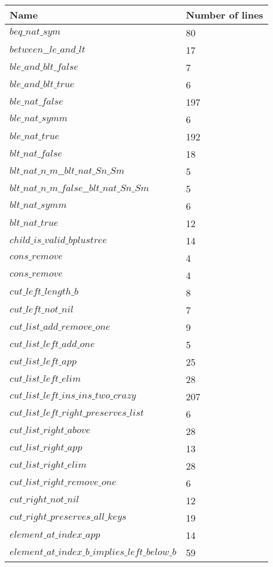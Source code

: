 \begin{tabular}{| l | l |}
\hline
Name & Number of lines \\ \hline
$beq\_nat\_sym$ & 80 \\ \hline
$between\_\_le\_and\_lt$ & 17 \\ \hline
$ble\_and\_blt\_false$ & 7 \\ \hline
$ble\_and\_blt\_true$ & 6 \\ \hline
$ble\_nat\_false$ & 197 \\ \hline
$ble\_nat\_symm$ & 6 \\ \hline
$ble\_nat\_true$ & 192 \\ \hline
$blt\_nat\_false$ & 18 \\ \hline
$blt\_nat\_n\_m\_\_blt\_nat\_Sn\_Sm$ & 5 \\ \hline
$blt\_nat\_n\_m\_false\_\_blt\_nat\_Sn\_Sm$ & 5 \\ \hline
$blt\_nat\_symm$ & 6 \\ \hline
$blt\_nat\_true$ & 12 \\ \hline
$child\_is\_valid\_bplustree$ & 14 \\ \hline
$cons\_remove$ & 4 \\ \hline
$cons\_remove$ & 4 \\ \hline
$cut\_left\_length\_b$ & 8 \\ \hline
$cut\_left\_not\_nil$ & 7 \\ \hline
$cut\_list\_add\_remove\_one$ & 9 \\ \hline
$cut\_list\_left\_add\_one$ & 5 \\ \hline
$cut\_list\_left\_app$ & 25 \\ \hline
$cut\_list\_left\_elim$ & 28 \\ \hline
$cut\_list\_left\_ins\_ins\_two\_crazy$ & 207 \\ \hline
$cut\_list\_left\_right\_preserves\_list$ & 6 \\ \hline
$cut\_list\_right\_above$ & 28 \\ \hline
$cut\_list\_right\_app$ & 13 \\ \hline
$cut\_list\_right\_elim$ & 28 \\ \hline
$cut\_list\_right\_remove\_one$ & 6 \\ \hline
$cut\_right\_not\_nil$ & 12 \\ \hline
$cut\_right\_preserves\_all\_keys$ & 19 \\ \hline
$element\_at\_index\_app$ & 14 \\ \hline
$element\_at\_index\_b\_implies\_left\_below\_b$ & 59 \\ \hline

\end{tabular}
